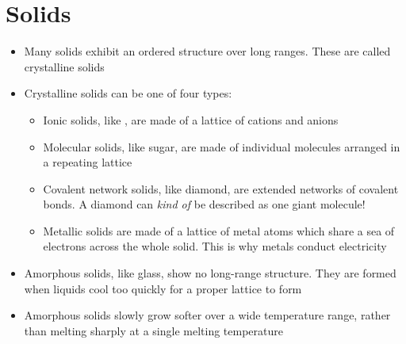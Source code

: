\documentclass[12pt, openany, letterpaper]{memoir}
\begin{document}
\section{Solids}
\begin{itemize}
	\item Many solids exhibit an ordered structure over long ranges. These are called crystalline solids
	\item Crystalline solids can be one of four types:
	      \begin{itemize}
		      \item Ionic solids, like , are made of a lattice of cations and anions
		      \item Molecular solids, like sugar, are made of individual molecules arranged in a repeating lattice
		      \item Covalent network solids, like diamond, are extended networks of covalent bonds. A diamond can \emph{kind of} be described as one giant molecule!
		      \item Metallic solids are made of a lattice of metal atoms which share a sea of electrons across the whole solid. This is why metals conduct electricity
	      \end{itemize}
	\item Amorphous solids, like glass, show no long-range structure. They are formed when liquids cool too quickly for a proper lattice to form
	\item Amorphous solids slowly grow softer over a wide temperature range, rather than melting sharply at a single melting temperature
\end{itemize}
\end{document}

